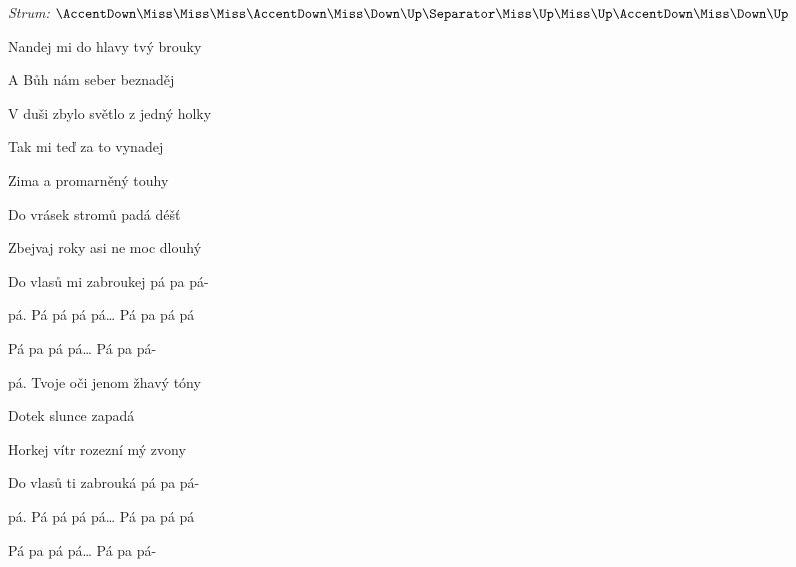 \begin{song}


\begin{headerbox}
\RaiseBoxWithAccents
\textit{Strum:} $\AccentDown\Miss\Miss\Miss\AccentDown\Miss\Down\Up \Separator \Miss\Up\Miss\Up\AccentDown\Miss\Down\Up$
\end{headerbox}

\begin{hchordbox}
\end{hchordbox}

\Large

\bigskip

 Nandej mi do hlavy tvý brouky \par
{} A Bůh nám seber beznaděj \par
{} V duši zbylo světlo z jedný holky \par
{} Tak mi teď za to vynadej \par

\bigskip

 Zima a promarněný touhy \par
{} Do vrásek stromů padá déšť \par
{} Zbejvaj roky asi ne moc dlouhý \par
{} Do vlasů mi zabroukej pá pa pá- \par

\bigskip

pá. Pá pá pá pá… Pá pa pá pá \par
{} Pá pa pá pá… Pá pa pá- \par

\bigskip

pá. Tvoje oči jenom žhavý tóny \par
{} Dotek slunce zapadá \par
{} Horkej vítr rozezní mý zvony \par
{} Do vlasů ti zabrouká pá pa pá- \par

\bigskip

pá. Pá pá pá pá… Pá pa pá pá \par
{} Pá pa pá pá… Pá pa pá- \par


\end{song}
